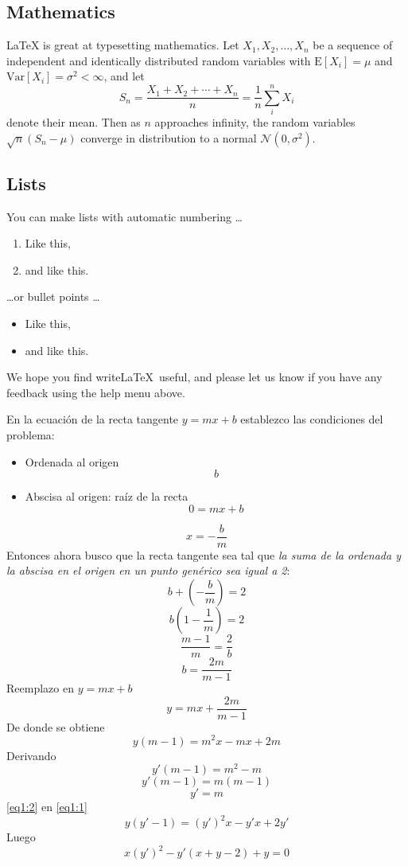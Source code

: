 \documentclass[a4paper,12pt]{article}
\begin{document}
\subsection{Mathematics}

\LaTeX{} is great at typesetting mathematics. Let $X_1, X_2, \ldots, X_n$ be a sequence of independent and identically distributed random variables with $\text{E}[X_i] = \mu$ and $\text{Var}[X_i] = \sigma^2 < \infty$, and let
$$S_n = \frac{X_1 + X_2 + \cdots + X_n}{n}
      = \frac{1}{n}\sum_{i}^{n} X_i$$
denote their mean. Then as $n$ approaches infinity, the random variables $\sqrt{n}(S_n - \mu)$ converge in distribution to a normal $\mathcal{N}(0, \sigma^2)$.

\subsection{Lists}

You can make lists with automatic numbering \dots

\begin{enumerate}
\item Like this,
\item and like this.
\end{enumerate}
\dots or bullet points \dots
\begin{itemize}
\item Like this,
\item and like this.
\end{itemize}

We hope you find write\LaTeX\ useful, and please let us know if you have any feedback using the help menu above.
\pagebreak


En la ecuación de la recta tangente $y = mx + b$ establezco las condiciones del problema:
\begin{itemize}
    \item Ordenada al origen $$b$$
    \item Abscisa al origen: raíz de la recta $$ 0 = mx + b$$
\end{itemize}
$$ x = -\frac{b}{m}$$
Entonces ahora busco que la recta tangente sea tal que \emph{la suma de la ordenada y la abscisa en el origen en un punto genérico sea igual a 2}:
$$b + (-\frac{b}{m}) = 2 $$
$$b (1-\frac{1}{m}) = 2$$
$$ \frac{m-1}{m} = \frac{2}{b} $$
$$ b = \frac{2m}{m-1} $$
Reemplazo en $y=mx+b$
$$ y = mx + \frac{2m}{m-1} $$
De donde se obtiene
\begin{equation}
\label{eq1:1}
    y(m-1)=m^2 x - mx + 2m
\end{equation}
Derivando 
$$ y'(m-1)=m^2 -m $$
$$ y'(m-1)=m(m-1) $$
\begin{equation}
\label{eq1:2}
    y' = m
\end{equation}
\ref{eq1:2} en \ref{eq1:1}
$$ y(y'-1)=(y')^2 x - y'x + 2y' $$
Luego
$$ x(y')^2-y'(x+y-2)+y = 0 $$
\end{document}
